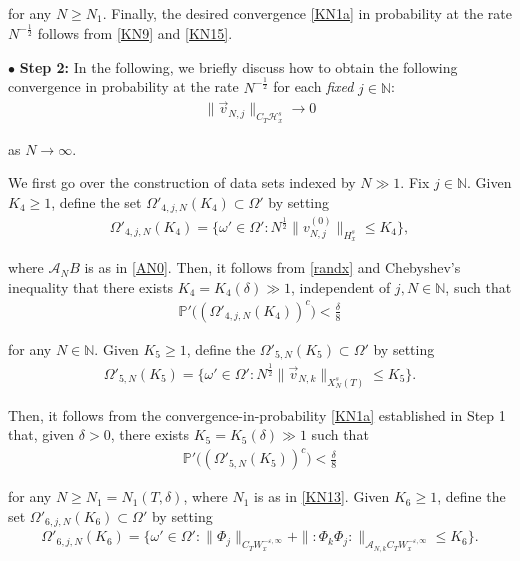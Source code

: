 \documentclass[letterpaper, 11pt,  reqno]{amsart}
\newcommand{\1}{\hspace{0.5mm}\text{I}\hspace{0.2mm}}
\newcommand{\noi}{\noindent}
\newcommand{\N}{\mathbb{N}}
\newcommand{\PP}{\mathbb{P}}
\renewcommand{\H}{\mathcal{H}}
\newcommand{\eps}{\varepsilon}
\newcommand{\dl}{\delta}
\newcommand{\A}{\mathcal{A}}
\newcommand{\wick}[1]{:\!{#1}\!:}
\newcommand{\too}{\longrightarrow}
\renewcommand{\O}{\Omega}
\renewcommand{\o}{\omega}
\numberwithin{equation}{section}
\numberwithin{theorem}{section}
\begin{document}
\noi
for any $N \ge N_1$.
Finally, 
 the desired convergence 
\eqref{KN1a} in probability at the rate $N^{-\frac 12}$
follows from \eqref{KN9} and \eqref{KN15}.






\medskip

\noi
$\bullet$ {\bf Step 2:}
In the following, we briefly discuss
how to obtain
 the following convergence
in probability
at the rate $N^{-\frac 12}$ for each {\it fixed}  $j \in \N$:
\begin{align}
 \| \vec v_{N, j} \|_{C_T \H_x^s}
\too 0  
\label{JN1}
\end{align}

\noi
as $N \to \infty$.


We first go over the construction of data sets indexed by $N \gg 1$.
Fix $j \in \N$.
Given $K_4 \ge 1$, define the set $\O'_{4, j, N}(K_4)\subset \O'$
by setting
\begin{align}
\O'_{4, j, N} (K_4)
= \Big\{\o' \in \O':
N^{\frac 12} \|  v^{(0)}_{N, j} \|_{ H_x^s} \le K_4\Big\}, 
\label{JN2}
\end{align}

\noi
where $\A_N B$ is as in \eqref{AN0}.
Then, it follows from  \eqref{randx} and Chebyshev's  inequality
 that 
 there exists $K_4 = K_4(\dl) \gg1 $,
independent of $j, N \in \N$,  such that 
\begin{align}
\PP'\big( (\O'_{4,j,  N}(K_4))^c \big) < \frac \dl 8
\label{JN3}
\end{align}

\noi
for any $N \in \N$.
Given $K_5 \ge 1$, 
define the $\O'_{5, N}(K_5)\subset \O'$
by setting
\begin{align}
\O'_{5, N} (K_5)= \Big\{\o' \in \O': 
N^{\frac 12}
\| \vec v_{N, k}\|_{X^s_{N}(T)} \le K_5\Big\}.
\label{JN4}
\end{align}

\noi
Then, it follows 
from the convergence-in-probability \eqref{KN1a}
established in
Step 1 that, given $\dl > 0$, 
 there exists $K_5 = K_5(\dl) \gg1 $
 such that 
\begin{align}
\PP'\big( (\O'_{5, N}(K_5))^c \big) < \frac \dl 8
\label{JN5}
\end{align}

\noi
for any $N \ge N_1 = N_1(T, \dl)$, 
where $N_1$ is as in \eqref{KN13}.
Given  $K_6 \ge 1 $, define the set $\O'_{6, j, N}(K_6) \subset \O'$ by setting 
\begin{align}
\O'_{6, j, N}(K_6) = \Big\{ \o' \in \O': 
 \| \Phi_j \|_{C_T W^{-\eps, \infty}_x} 
 + 
 \| \wick{\Phi_k\Phi_j} \|_{\A_{N, k}C_T W^{-\eps, \infty}_x}  \le K_6\Big\}.
\label{JN6}
\end{align}
\end{document}
